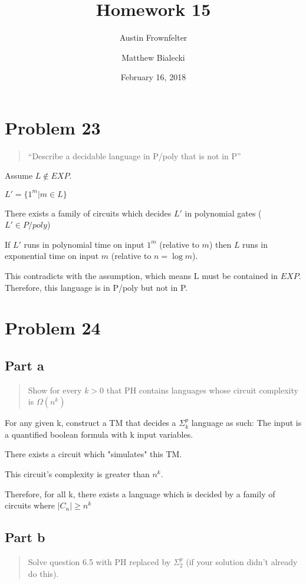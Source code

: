 \documentclass{article}
\title{Homework 15}
\author{Austin Frownfelter \and Matthew Bialecki}
\date{February 16, 2018}
\begin{document}
\maketitle

\section{Problem 23}
\begin{quote}
``Describe a decidable language in P/poly that is not in P''
\end{quote}


Assume $L \notin EXP$.

$L'=\{1^m | m\in L\}$

There exists a family of circuits which decides $L'$ in polynomial gates ($L'\in P/poly$)

If $L'$ runs in polynomial time on input $1^m$ (relative to $m$) then $L$ runs in exponential time on input $m$ (relative to $n = \log m$).

This contradicts with the assumption, which means L must be contained in $EXP$.  Therefore, this language is in P/poly but not in P.


\section {Problem 24}
\subsection{Part a}
\begin{quote}
Show for every $k > 0$ that PH contains languages whose circuit complexity is $\Omega(n^k)$
\end{quote}

For any given k, construct a TM that decides a $\Sigma_k^p$ language as such: The input is a quantified boolean formula with k input variables.

There exists a circuit which "simulates" this TM.

This circuit's complexity is greater than $n^k$.

Therefore, for all k, there exists a language which is decided by a family of circuits where $|C_n|\geq n^k$

\subsection{Part b}
\begin{quote}
Solve question 6.5 with PH replaced by $\Sigma_{2}^p$ (if your solution didn't already do this).
\end{quote}
\end{document}
